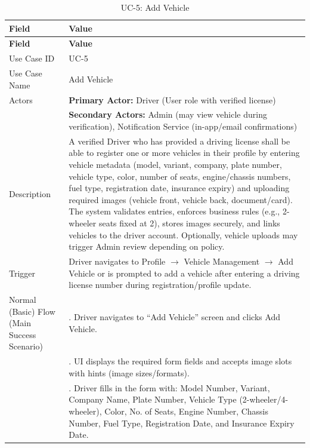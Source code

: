 \begin{longtable}{|>{\raggedright\arraybackslash}p{4cm}|>{\raggedright\arraybackslash}p{11cm}|}
\caption{UC-5: Add Vehicle}
\label{tab:uc-5} \\
\hline
\rowcolor{lightgray!30}
\textbf{Field} & \textbf{Value} \\
\hline
\endfirsthead
\hline
\rowcolor{lightgray!30}
\textbf{Field} & \textbf{Value} \\
\hline
\endhead
\hline
\endfoot
\hline
\endlastfoot
Use Case ID & UC-5 \\
\hline
Use Case Name & Add Vehicle \\
\hline
Actors & \textbf{Primary Actor:} Driver (User role with verified license) \\
& \textbf{Secondary Actors:} Admin (may view vehicle during verification), Notification Service (in-app/email confirmations) \\
\hline
Description & A verified Driver who has provided a driving license shall be able to register one or more vehicles in their profile by entering vehicle metadata (model, variant, company, plate number, vehicle type, color, number of seats, engine/chassis numbers, fuel type, registration date, insurance expiry) and uploading required images (vehicle front, vehicle back, document/card). The system validates entries, enforces business rules (e.g., 2-wheeler seats fixed at 2), stores images securely, and links vehicles to the driver account. Optionally, vehicle uploads may trigger Admin review depending on policy. \\
\hline
Trigger & Driver navigates to Profile $\rightarrow$ Vehicle Management $\rightarrow$ Add Vehicle or is prompted to add a vehicle after entering a driving license number during registration/profile update. \\
\hline
Normal (Basic) Flow (Main Success Scenario) & 1. Driver navigates to ``Add Vehicle'' screen and clicks Add Vehicle. \\
& 2. UI displays the required form fields and accepts image slots with hints (image sizes/formats). \\
& 3. Driver fills in the form with: Model Number, Variant, Company Name, Plate Number, Vehicle Type (2-wheeler/4-wheeler), Color, No. of Seats, Engine Number, Chassis Number, Fuel Type, Registration Date, and Insurance Expiry Date. \\

\end{longtable}
